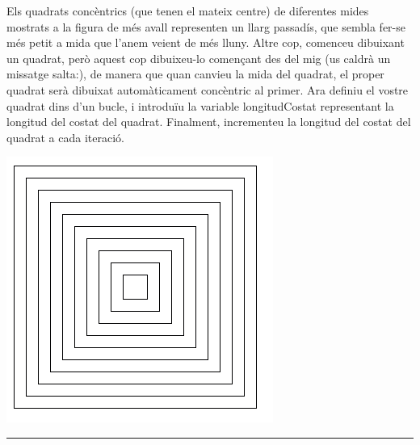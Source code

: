 \begin{center}
\colorbox{black}{}
\end{center}
{\small
\noindent
Els quadrats concèntrics (que tenen el mateix centre) de diferentes mides mostrats a la figura de més avall representen un llarg passadís, que sembla fer-se més petit a mida que l'anem veient de més lluny. Altre cop, comenceu dibuixant un quadrat, però aquest cop dibuixeu-lo començant des del mig (us caldrà un missatge \textsf{salta:}), de manera que quan canvieu la mida del quadrat, el proper quadrat serà dibuixat automàticament concèntric al primer. Ara definiu el vostre quadrat dins d'un bucle, i introduïu la variable \textsf{longitudCostat} representant la longitud del costat del quadrat. Finalment, incrementeu la longitud del costat del quadrat a cada iteració.}
\begin{center}
\includegraphics[scale=0.25]{Imatges/figuraE10-5.png}
\end{center}
\noindent
\rule{\textwidth}{3pt}

